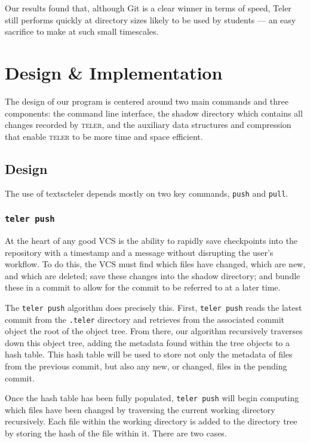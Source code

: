 \documentclass[12pt, letterpaper]{article}
\begin{document}
\begin{multicols}{2}
  Our results found that, although Git is a clear winner in terms of
  speed, Teler still performs quickly at directory sizes likely to
  be used by students --- an easy sacrifice to make at such small
  timescales.

  \section{Design \& Implementation}
  \label{sec:desimp}
  The design of our program is centered around two main commands and
  three components: the command line interface, the shadow directory
  which contains all changes recorded by \textsc{teler}, and the
  auxiliary data structures and compression that enable \textsc{teler}
  to be more time and space efficient.

  \subsection{Design}
  \label{subsec:design}
  The use of textsc{teler} depends mostly on two key commands,
  \texttt{push} and \texttt{pull}.

  \subsubsection{\texttt{teler push}}
  \label{subsubsec:push}
  At the heart of any good VCS is the ability to rapidly save
  checkpoints into the repository with a timestamp and a message
  without disrupting the user's workflow. To do this, the VCS must
  find which files have changed, which are new, and which are deleted;
  save these changes into the shadow directory; and bundle these in a
  commit to allow for the commit to be referred to at a later time.

  The \texttt{teler push} algorithm does precisely this. First,
  \texttt{teler push} reads the latest commit from the \texttt{.teler}
  directory and retrieves from the associated commit object the root
  of the object tree. From there, our algorithm recursively traverses
  down this object tree, adding the metadata found within the tree
  objects to a hash table. This hash table will be used to store not only
  the metadata of files from the previous commit, but also any
  new, or changed, files in the pending commit.

  Once the hash table has been fully populated, \texttt{teler push}
  will begin computing which files have been changed by traversing the
  current working directory recursively. Each file within the working
  directory is added to the directory tree by storing the hash of the
  file within it. There are two cases.


\end{multicols}
\end{document}
